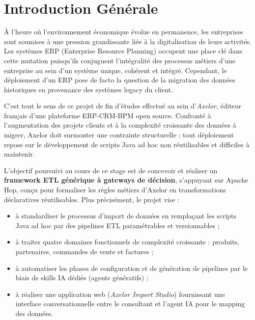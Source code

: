 \chapter*{Introduction Générale}

\vspace{0.5cm}

À l'heure où l'environnement économique évolue en permanence, les entreprises sont soumises à une pression grandissante liée à la digitalisation de leurs activités. Les systèmes ERP (Enterprise Resource Planning) occupent une place clé dans cette mutation puisqu'ils conjuguent l'intégralité des processus métiers d'une entreprise au sein d'un système unique, cohérent et intégré. Cependant, le déploiement d'un ERP pose de facto la question de la migration des données historiques en provenance des systèmes legacy du client.

C'est tout le sens de ce projet de fin d'études effectué au sein d'\textit{Axelor}, éditeur français d'une plateforme ERP-CRM-BPM open source. Confronté à l'augmentation des projets clients et à la complexité croissante des données à migrer, Axelor doit surmonter une contrainte structurelle : tout déploiement repose sur le développement de scripts Java ad hoc non réutilisables et difficiles à maintenir.

L'objectif poursuivi au cours de ce stage est de concevoir et réaliser un \textbf{framework ETL générique à gateways de décision}, s'appuyant sur Apache Hop, conçu pour formaliser les règles métiers d'Axelor en transformations déclaratives réutilisables. Plus précisément, le projet vise :

\begin{itemize}
  \item à standardiser le processus d'import de données en remplaçant les scripts Java ad hoc par des pipelines ETL paramétrables et versionnables ;
  \item à traiter quatre domaines fonctionnels de complexité croissante : produits, partenaires, commandes de vente et factures ;
  \item à automatiser les phases de configuration et de génération de pipelines par le biais de skills IA dédiés (agents génératifs) ;
  \item à réaliser une application web (\textit{Axelor Import Studio}) fournissant une interface conversationnelle entre le consultant et l'agent IA pour le mapping des données.
\end{itemize}

